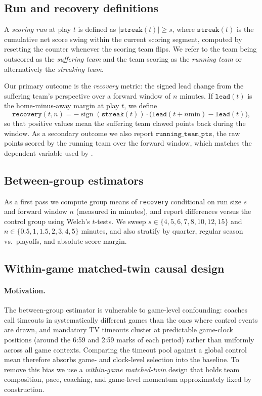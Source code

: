 \documentclass[twoside,11pt]{article}
\begin{document}
\subsection{Run and recovery definitions}

A \emph{scoring run} at play $t$ is defined as $|\texttt{streak}(t)| \geq s$, where $\texttt{streak}(t)$ is
the cumulative net score swing within the current scoring segment, computed by resetting the counter whenever
the scoring team flips. We refer to the team being outscored as the \emph{suffering team} and the team
scoring as the \emph{running team} or alternatively the \emph{streaking team}.

Our primary outcome is the \emph{recovery} metric: the signed lead change from the suffering team's
perspective over a forward window of $n$ minutes. If $\texttt{lead}(t)$ is the home-minus-away margin at play
$t$, we define
\[
		\texttt{recovery}(t, n) = -\operatorname{sign}(\texttt{streak}(t)) \cdot \bigl(\texttt{lead}(t + n\text{
		min}) - \texttt{lead}(t)\bigr),
\]
so that positive values mean the suffering team clawed points back during the window. As a secondary outcome
we also report $\texttt{running\_team\_pts}$, the raw points scored by the running team over the forward
window, which matches the dependent variable used by \citet{weimer2023causal}.

\subsection{Between-group estimators}

As a first pass we compute group means of \texttt{recovery} conditional on run size $s$ and forward window
$n$ (measured in minutes), and report differences versus the control group using Welch's $t$-tests. We sweep
$s \in \{4, 5, 6, 7,
8, 10, 12, 15\}$ and $n \in \{0.5, 1, 1.5, 2, 3, 4, 5\}$ minutes, and also stratify by quarter, regular season
vs.\ playoffs, and absolute score margin.

\subsection{Within-game matched-twin causal design}\label{sec:matched-twin}

\paragraph{Motivation.}
The between-group estimator is vulnerable to game-level confounding: coaches call timeouts in systematically
different games than the ones where control events are drawn, and mandatory TV timeouts cluster at
predictable game-clock positions (around the 6:59 and 2:59 marks of each period) rather than uniformly
across all game contexts. Comparing the timeout pool against a global control mean therefore absorbs game-
and clock-level selection into the baseline. To remove this bias we use a \emph{within-game matched-twin}
design that holds team composition, pace, coaching, and game-level momentum approximately fixed by
construction.
\end{document}
